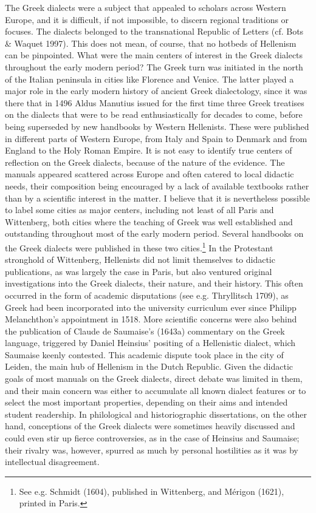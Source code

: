 \documentclass[12pt]{article}
\newenvironment{styleStandard}{\renewcommand\baselinestretch{1.25}\setlength\leftskip{0in}\setlength\rightskip{0in}\setlength\parindent{0.1972in}\setlength\parfillskip{0pt plus 1fil}\setlength\parskip{0in plus 1pt}\writerlistparindent\writerlistleftskip\leavevmode\normalfont\normalsize\writerlistlabel\ignorespaces}{\unskip\vspace{0in plus 1pt}\par}
\newcommand\writerlistleftskip{}
\newcommand\writerlistparindent{}
\newcommand\writerlistlabel{}
\begin{document}
\begin{styleStandard}
The Greek dialects were a subject that appealed to scholars across Western Europe, and it is difficult, if not impossible, to discern regional traditions or focuses. The dialects belonged to the transnational Republic of Letters (cf. Bots \& Waquet 1997). This does not mean, of course, that no hotbeds of Hellenism can be pinpointed. What were the main centers of interest in the Greek dialects throughout the early modern period? The Greek turn was initiated in the north of the Italian peninsula in cities like Florence and Venice. The latter played a major role in the early modern history of ancient Greek dialectology, since it was there that in 1496 Aldus Manutius issued for the first time three Greek treatises on the dialects that were to be read enthusiastically for decades to come, before being superseded by new handbooks by Western Hellenists. These were published in different parts of Western Europe, from Italy and Spain to Denmark and from England to the Holy Roman Empire. It is not easy to identify true centers of reflection on the Greek dialects, because of the nature of the evidence. The manuals appeared scattered across Europe and often catered to local didactic needs, their composition being encouraged by a lack of available textbooks rather than by a scientific interest in the matter. I believe that it is nevertheless possible to label some cities as major centers, including not least of all Paris and Wittenberg, both cities where the teaching of Greek was well established and outstanding throughout most of the early modern period. Several handbooks on the Greek dialects were published in these two cities.\footnote{ See e.g. Schmidt (1604), published in Wittenberg, and Mérigon (1621), printed in Paris.} In the Protestant stronghold of Wittenberg, Hellenists did not limit themselves to didactic publications, as was largely the case in Paris, but also ventured original investigations into the Greek dialects, their nature, and their history. This often occurred in the form of academic disputations (see e.g. Thryllitsch 1709), as Greek had been incorporated into the university curriculum ever since Philipp Melanchthon’s appointment in 1518. More scientific concerns were also behind the publication of Claude de Saumaise’s (1643a) commentary on the Greek language, triggered by Daniel Heinsius’ positing of a Hellenistic dialect, which Saumaise keenly contested. This academic dispute took place in the city of Leiden, the main hub of Hellenism in the Dutch Republic. Given the didactic goals of most manuals on the Greek dialects, direct debate was limited in them, and their main concern was either to accumulate all known dialect features or to select the most important properties, depending on their aims and intended student readership. In philological and historiographic dissertations, on the other hand, conceptions of the Greek dialects were sometimes heavily discussed and could even stir up fierce controversies, as in the case of Heinsius and Saumaise; their rivalry was, however, spurred as much by personal hostilities as it was by intellectual disagreement.
\end{styleStandard}
\end{document}

